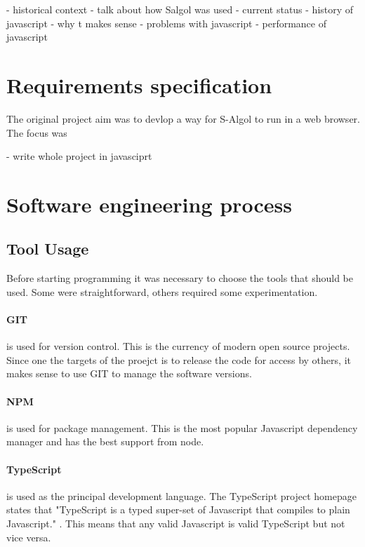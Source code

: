 \documentclass{article}
\begin{document}
- historical context
- talk about how Salgol was used
- current status
- history of javascript
- why t makes sense
- problems with javascript
- performance of javascript


\section{Requirements specification}

The original project aim was to devlop a way for S-Algol to run in a web browser. The focus was 

-  write whole project in javasciprt

\section{Software engineering process}

\subsection{Tool Usage}

Before starting programming it was necessary to choose the tools that should be used. Some were straightforward, others required some experimentation.

\paragraph{GIT} is used for version control. This is the currency of modern open source projects. Since one the targets of the proejct is to release the code for access by others, it makes sense to use GIT to manage the software versions.

\paragraph{NPM} is used for package management. This is the most popular Javascript dependency manager and has the best support from node.

\paragraph{TypeScript} is used as the principal development language. The TypeScript project homepage states that "TypeScript is a typed super-set of Javascript that compiles to plain Javascript." \cite{typescript}. This means that any valid Javascript is valid TypeScript but not vice versa.
\end{document}
